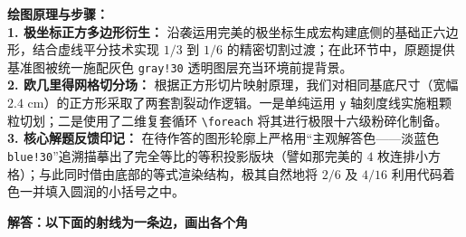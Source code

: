 \vspace{0.4cm}
{\small\color{blue!70!black}
\textbf{绘图原理与步骤：}\\
\textbf{1. 极坐标正方多边形衍生：} 沿袭运用完美的极坐标生成宏构建底侧的基础正六边形，结合虚线平分技术实现 $1/3$ 到 $1/6$ 的精密切割过渡；在此环节中，原题提供基准图被统一施配灰色 \texttt{gray!30} 透明图层充当环境前提背景。\\
\textbf{2. 欧几里得网格切分场：} 根据正方形切片映射原理，我们对相同基底尺寸（宽幅 $2.4\text{ cm}$）的正方形采取了两套割裂动作逻辑。一是单纯运用 \texttt{y} 轴刻度线实施粗颗粒切划；二是使用了二维复套循环 \texttt{\textbackslash foreach} 将其进行极限十六级粉碎化制备。\\
\textbf{3. 核心解题反馈印记：} 在待作答的图形轮廓上严格用“主观解答色——淡蓝色 \texttt{blue!30}”追溯描摹出了完全等比的等积投影版块（譬如那完美的 $4$ 枚连排小方格）；与此同时借由底部的等式渲染结构，极其自然地将 $2/6$ 及 $4/16$ 利用代码着色一并填入圆润的小括号之中。
}






\newpage

\begin{center}
  {\large\bfseries 解答：以下面的射线为一条边，画出各个角}
\end{center}

\vspace{0.5cm}


